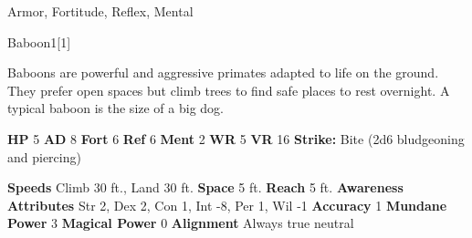     
     Armor,
     Fortitude,
     Reflex,
     Mental
  
  
      
  \begin{monsection}{Baboon}{1}[1]
    \vspace{-1em}\vspace{-1em}
    \vspace{0em}

    
      Baboons are powerful and aggressive primates adapted to life on the ground.
      They prefer open spaces but climb trees to find safe places to rest overnight.
      A typical baboon is the size of a big dog.
    
    

    \begin{spellcontent}
      \begin{spelltargetinginfo}
        \pari \textbf{HP} 5 \monsep
          \textbf{AD} 8 \monsep
          \textbf{Fort} 6 \monsep
          \textbf{Ref} 6 \monsep
          \textbf{Ment} 2
        \pari \textbf{WR} 5 \monsep
        \textbf{VR} 16
        \pari \textbf{Strike:}
            Bite  (2d6 bludgeoning and piercing)
      \end{spelltargetinginfo}
    \end{spellcontent}
    \begin{monsterfooter}
      \pari \textbf{Speeds} Climb 30 ft., Land 30 ft. \monsep
        \textbf{Space} 5 ft. \monsep
        \textbf{Reach} 5 ft.
      \pari \textbf{Awareness} 
      \pari \textbf{Attributes}
        Str 2, Dex 2,
        Con 1, Int -8,
        Per 1, Wil -1
      \pari \textbf{Accuracy} 1 \monsep
        \textbf{Mundane Power} 3 \monsep
      \textbf{Magical Power} 0
      \pari \textbf{Alignment} Always true neutral
    \end{monsterfooter}
  \end{monsection}
  
